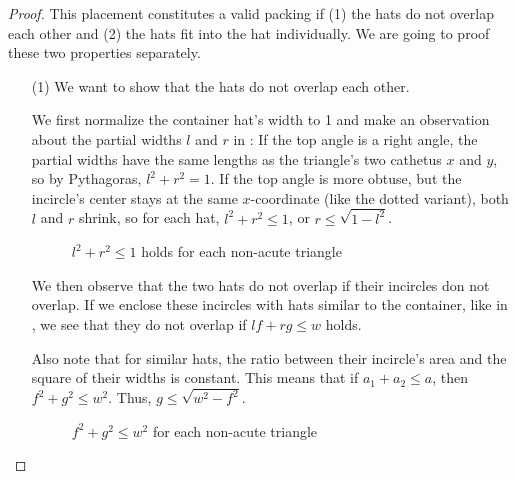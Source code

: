 \documentclass[%
    a4paper,              %
    style=screen,          %
    bibliography=totoc,   %
    nexus,                %
    lnum,                 %
    extramargin,          %
]{tubsbook}
\newcommand\defaulta{30}
\newcommand\defaultb{40}
\newcommand\defaultx{0.6}
\begin{document}
\begin{proof}
    This placement constitutes a valid packing if (1) the hats do not overlap each other and (2) the hats fit into the hat individually. We are going to proof these two properties separately.

    \begin{itemize}
        \item[(1)]
            We want to show that the hats do not overlap each other.

            We first normalize the container hat's width to 1 and make an observation about the partial widths $l$ and $r$ in : If the top angle is a right angle, the partial widths have the same lengths as the triangle's two cathetus $x$ and $y$, so by Pythagoras, $l^2 + r^2 = 1$. If the top angle is more obtuse, but the incircle's center stays at the same $x$-coordinate (like the dotted variant), both $l$ and $r$ shrink, so for each hat, $l^2 + r^2 \le 1$, or $r \le \sqrt{1-l^2}$.

            \begin{figure}[htbp!]
                \centering


                \caption{$l^2 + r^2 \le 1$ holds for each non-acute triangle}
                \label{fig:hatlr}
            \end{figure}

            We then observe that the two hats do not overlap if their incircles don not overlap. If we enclose these incircles with hats similar to the container, like in , we see that they do not overlap if $lf + rg \le w$ holds.

            Also note that for similar hats, the ratio between their incircle's area and the square of their widths is constant. This means that if $a_1 + a_2 \le a$, then $f^2 + g^2 \le w^2$. Thus, $g \le \sqrt{w^2-f^2}$.

            \begin{figure}[htbp!]
                \centering


                \caption{$f^2 + g^2 \le w^2$ for each non-acute triangle}
                \label{fig:hatsoverlap}
            \end{figure}


\end{itemize}
\end{proof}
\end{document}
